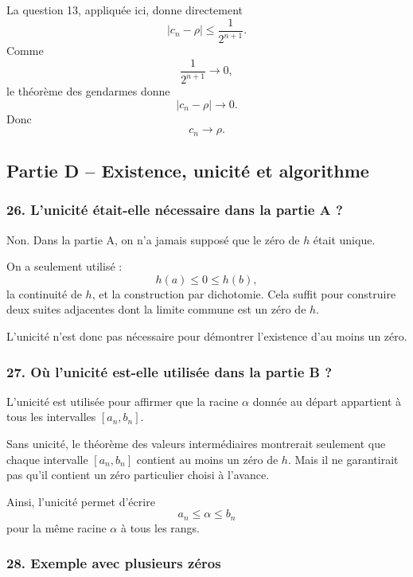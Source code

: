 \documentclass[11pt,a4paper]{article}
\begin{document}
La question 13, appliquée ici, donne directement
\[
|c_n-\rho|\leq\frac1{2^{n+1}}.
\]
Comme
\[
\frac1{2^{n+1}}\to0,
\]
le théorème des gendarmes donne
\[
|c_n-\rho|\to0.
\]
Donc
\[
c_n\to\rho.
\]


\subsection*{Partie D -- Existence, unicité et algorithme}

\subsubsection*{26. L'unicité était-elle nécessaire dans la partie A ?}

Non. Dans la partie A, on n'a jamais supposé que le zéro de \(h\) était unique.

On a seulement utilisé :
\[
h(a)\leq0\leq h(b),
\]
la continuité de \(h\), et la construction par dichotomie. Cela suffit pour construire deux suites adjacentes dont la limite commune est un zéro de \(h\).

L'unicité n'est donc pas nécessaire pour démontrer l'existence d'au moins un zéro.


\subsubsection*{27. Où l'unicité est-elle utilisée dans la partie B ?}

L'unicité est utilisée pour affirmer que la racine \(\alpha\) donnée au départ appartient à tous les intervalles \([a_n,b_n]\).

Sans unicité, le théorème des valeurs intermédiaires montrerait seulement que chaque intervalle \([a_n,b_n]\) contient au moins un zéro de \(h\). Mais il ne garantirait pas qu'il contient un zéro particulier choisi à l'avance.

Ainsi, l'unicité permet d'écrire
\[
a_n\leq\alpha\leq b_n
\]
pour la même racine \(\alpha\) à tous les rangs.


\subsubsection*{28. Exemple avec plusieurs zéros}
\end{document}

